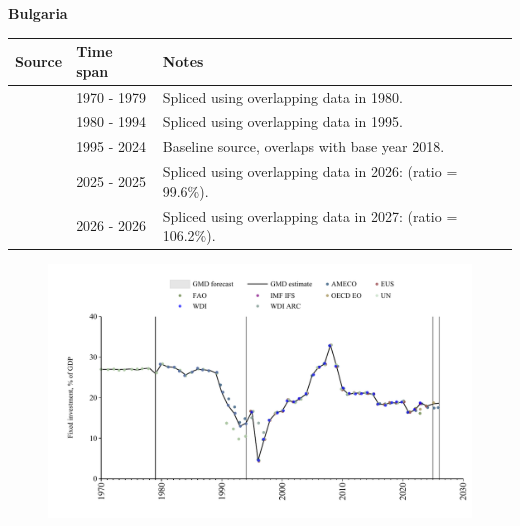 \documentclass[12pt,a4paper,landscape]{article}
\begin{document}
\begin{adjustbox}{max totalsize={\paperwidth}{\paperheight},center}
\begin{minipage}[t][\textheight][t]{\textwidth}
\vspace*{0.5cm}
{}
\begin{center}
{\Large\bfseries Bulgaria}
\end{center}
\vspace{0.5cm}
\begin{table}[H]
\centering
\small
\begin{tabular}{|l|l|l|}
\hline
\textbf{Source} & \textbf{Time span} & \textbf{Notes} \\
\hline
\rowcolor{white}\cite{UN}& 1970 - 1979 &Spliced using overlapping data in 1980.\\
\rowcolor{lightgray}\cite{WDI}& 1980 - 1994 &Spliced using overlapping data in 1995.\\
\rowcolor{white}\cite{EUS}& 1995 - 2024 &Baseline source, overlaps with base year 2018.\\
\rowcolor{lightgray}\cite{OECD_EO}& 2025 - 2025 &Spliced using overlapping data in 2026: (ratio = 99.6\%).\\
\rowcolor{white}\cite{AMECO}& 2026 - 2026 &Spliced using overlapping data in 2027: (ratio = 106.2\%).\\
\hline
\end{tabular}
\end{table}
\begin{figure}[H]
\centering
\includegraphics[width=\textwidth,height=0.6\textheight,keepaspectratio]{graphs/BGR_finv_GDP.pdf}
\end{figure}
\end{minipage}
\end{adjustbox}
\end{document}
